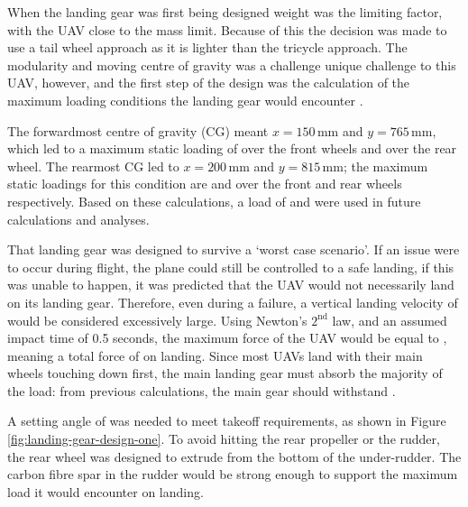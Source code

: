 \documentclass[../../main.tex]{subfiles}
\begin{document}
When the landing gear was first being designed weight was the limiting factor, with the UAV close to the  mass limit.
Because of this the decision was made to use a tail wheel approach as it is lighter than the tricycle approach.
The modularity and moving centre of gravity was a challenge unique challenge to this UAV, however, and the first step of the design was the calculation of the maximum loading conditions the landing gear would encounter \cite{goud-14}. 


The forwardmost centre of gravity (CG) meant $x=150\,\mathrm{mm}$ and $y=765\,\mathrm{mm}$, which led to a maximum static loading of  over the front wheels and  over the rear wheel.
The rearmost CG led to $x=200\,\mathrm{mm}$ and $y=815\,\mathrm{mm}$; the maximum static loadings for this condition are  and  over the front and rear wheels respectively.
Based on these calculations, a load of  and  were used in future calculations and analyses. 

That landing gear was designed to survive a ‘worst case scenario’.
If an issue were to occur during flight, the plane could still be controlled to a safe landing, if this was unable to happen, it was predicted that the UAV would not necessarily land on its landing gear.
Therefore, even during a failure, a vertical landing velocity of  would be considered excessively large.
Using Newton's $2^\mathrm{nd}$ law, and an assumed impact time of 0.5 seconds, the maximum force of the UAV would be equal to , meaning a total force of  on landing.
Since most UAVs land with their main wheels touching down first, the main landing gear must absorb the majority of the load: from previous calculations, the main gear should withstand .  


A setting angle of  was needed to meet takeoff requirements, as shown in Figure \ref{fig:landing-gear-design-one}.
To avoid hitting the rear propeller or the rudder, the rear wheel was designed to extrude from the bottom of the under-rudder.
The carbon fibre spar in the rudder would be strong enough to support the maximum  load it would encounter on landing. 

\end{document}
